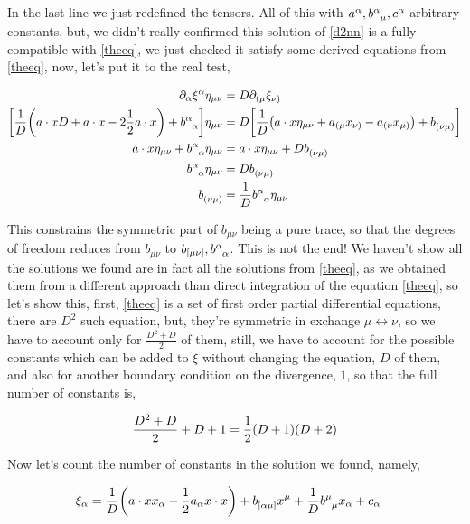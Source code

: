 In the last line we just redefined the tensors. All of this with $a^\alpha,\tensor{b}{^\alpha_\mu},c^\alpha$ arbitrary constants, but, we didn't really 
confirmed this solution of \ref{d2nn} is a fully compatible with \ref{theeq}, we just checked it satisfy some derived equations from \ref{theeq}, now, let's put it to 
the real test,

\begin{align*}
    \partial_\alpha\xi^\alpha\eta_{\mu\nu}&=D\partial_{(\mu}\xi_{\nu)}\\
    \qty[\frac1D\qty(a\cdot x D+a\cdot x-2\frac12a\cdot x)+\tensor{b}{^\alpha_\alpha}]\eta_{\mu\nu}&=D\qty[\frac1D\qty(a\cdot x \eta_{\mu\nu}+a_{(\mu} x_{\nu)}-a_{(\nu} x_{\mu)})+\tensor{b}{_{(\nu}_{\mu)}}]\\
    a\cdot x\eta_{\mu\nu} +\tensor{b}{^\alpha_\alpha}\eta_{\mu\nu}&=a\cdot x \eta_{\mu\nu}+D\tensor{b}{_{(\nu}_{\mu)}}\\
    \tensor{b}{^\alpha_\alpha}\eta_{\mu\nu}&=D\tensor{b}{_{(\nu}_{\mu)}}\\
    \tensor{b}{_{(\nu}_{\mu)}}&=\frac1D\tensor{b}{^\alpha_\alpha}\eta_{\mu\nu}
\end{align*}

This constrains the symmetric part of $b_{\mu\nu}$ being a pure trace, so that the degrees of freedom reduces from $b_{\mu\nu}$ to $b_{[\mu\nu]}, \tensor{b}{^\alpha_\alpha}$. This is not the end! 
We haven't show all the solutions we found are in fact all the solutions from \ref{theeq}, as we obtained them from a different approach than direct integration of the equation \ref{theeq}, so let's show this, 
first, \ref{theeq} is a set of first order partial differential equations, there are $D^2$ such equation, but, they're symmetric in exchange $\mu\leftrightarrow\nu$, so we have to account only for $\frac{D^2+D}{2}$ of them, still, we have to account for 
the possible constants which can be added to $\xi$ without changing the equation, $D$ of them, and also for another boundary condition on the divergence, $1$, so that the full number of constants is,

\begin{align*}
    \frac{D^2+D}{2}+D+1=\frac12\qty(D+1)\qty(D+2)
\end{align*}

Now let's count the number of constants in the solution we found, namely,

\begin{align*}
    \xi_\alpha&=\frac1D\qty(a\cdot x x_\alpha-\frac12a_\alpha x\cdot x)+\tensor{b}{_{[\alpha}_{\mu]}}x^\mu+\frac1D\tensor{b}{^\mu_\mu}x_\alpha+c_\alpha
\end{align*}

